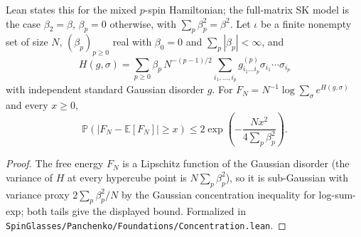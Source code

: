 \begin{theorem}\label{thm:sg-tal:concentration}
  \leanok
{}
Lean states this for the mixed $p$-spin Hamiltonian; the full-matrix SK model is the case $\beta_2=\beta$, $\beta_p=0$ otherwise, with $\sum_p\beta_p^2=\beta^2$. Let $\iota$ be a finite nonempty set of size $N$, $(\beta_p)_{p\ge0}$ real with $\beta_0=0$ and $\sum_p|\beta_p|<\infty$, and
\[
H(g,\sigma)=\sum_{p\ge0}\beta_p\,N^{-(p-1)/2}\sum_{i_1,\dots,i_p}g^{(p)}_{i_1\dots i_p}\sigma_{i_1}\cdots\sigma_{i_p}
\]
with independent standard Gaussian disorder $g$. For $F_N=N^{-1}\log\sum_\sigma e^{H(g,\sigma)}$ and every $x\ge0$,
\[
\mathbb{P}\left(\left|F_N - \mathbb{E}[F_N]\right| \ge x\right) \le 2 \exp\left(-\frac{N x^2}{4\sum_p\beta_p^2}\right).
\]
\end{theorem}
\begin{proof}
  \leanok
The free energy $F_N$ is a Lipschitz function of the Gaussian disorder (the variance of $H$ at every hypercube point is $N\sum_p\beta_p^2$), so it is sub-Gaussian with variance proxy $2\sum_p\beta_p^2/N$ by the Gaussian concentration inequality for log-sum-exp; both tails give the displayed bound.
Formalized in \texttt{SpinGlasses/Panchenko/Foundations/Concentration.lean}.
\end{proof}

